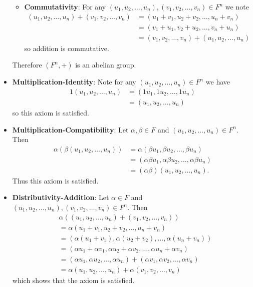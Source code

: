 \begin{questions}
\begin{itemize}
\begin{itemize}
            \item \textbf{Commutativity}: For any $(u_1, u_2, \dots, u_n), (v_1, v_2, \dots, v_n) \in F^n$ we note
            \begin{align*}
                (u_1, u_2, \dots, u_n) + (v_1, v_2, \dots, v_n) &= (u_1 + v_1, u_2 + v_2, \dots, u_n + v_n)\\
                &= (v_1 + u_1, v_2 + u_2, \dots, v_n + u_n)\\
                &= (v_1, v_2, \dots, v_n) + (u_1, u_2, \dots, u_n)
            \end{align*}
            so addition is commutative.
        \end{itemize}
        Therefore $(F^n, +)$ is an abelian group.

        \item \textbf{Multiplication-Identity}: Note for any $(u_1, u_2, \dots, u_n) \in F^n$ we have
        \begin{align*}
            1(u_1, u_2, \dots, u_n) &= (1u_1, 1u_2, \dots, 1u_n)\\
            &= (u_1, u_2, \dots, u_n)
        \end{align*}
        so this axiom is satisfied.

        \item \textbf{Multiplication-Compatibility}: Let $\alpha, \beta \in F$ and $(u_1, u_2, \dots, u_n) \in F^n$. Then
        \begin{align*}
            \alpha(\beta(u_1, u_2, \dots, u_n)) &= \alpha(\beta u_1, \beta u_2, \dots, \beta u_n)\\
            &= (\alpha\beta u_1, \alpha\beta u_2, \dots, \alpha\beta u_n)\\
            &= (\alpha\beta)(u_1, u_2, \dots, u_n).
        \end{align*}
        Thus this axiom is satisfied.

        \item \textbf{Distributivity-Addition}: Let $\alpha \in F$ and $(u_1, u_2, \dots, u_n), (v_1, v_2, \dots, v_n) \in F^n$. Then
        \begin{align*}
            &\alpha((u_1, u_2, \dots, u_n) + (v_1, v_2, \dots, v_n))\\
            &= \alpha(u_1 + v_1, u_2 + v_2, \dots, u_n + v_n)\\
            &= (\alpha(u_1 + v_1), \alpha(u_2 + v_2), \dots, \alpha(u_n + v_n))\\
            &= (\alpha u_1 + \alpha v_1, \alpha u_2 + \alpha v_2, \dots, \alpha u_n + \alpha v_n)\\
            &= (\alpha u_1, \alpha u_2, \dots, \alpha u_n) + (\alpha v_1, \alpha v_2, \dots, \alpha v_n)\\
            &= \alpha(u_1, u_2, \dots, u_n) + \alpha(v_1, v_2, \dots, v_n)
        \end{align*}
        which shows that the axiom is satisfied.


\end{itemize}
\end{questions}

